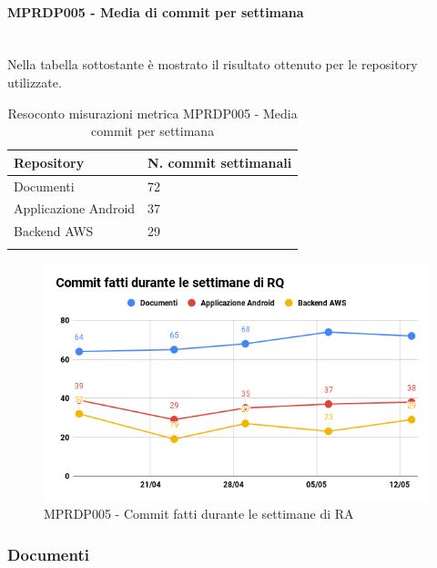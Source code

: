 \paragraph{MPRDP005 - Media di commit per settimana}\mbox{}\\[0.4cm]
Nella tabella sottostante è mostrato il risultato ottenuto per le repository utilizzate.
\begin{center}
	\centering
	\renewcommand{\arraystretch}{1.5}
	\begin{longtable}{  p{5cm}  p{5cm} }
		\rowcolor{tableHeadYellow}
		\textbf{Repository}   & \textbf{N. commit settimanali} \\ 
		\endhead
		Documenti    			   & 72 \\
		Applicazione Android  & 37 \\
		Backend AWS    & 29          \\
		\rowcolor{white}
		\caption{Resoconto misurazioni metrica MPRDP005 - Media commit per settimana}
	\end{longtable}
\end{center}
\begin{figure}[H]
	\centering
	\includegraphics[width=13cm,keepaspectratio]{../includes/pics/Commit_RA.png}
	\caption{\label{fig:mission}MPRDP005 - Commit fatti durante le settimane di RA}
\end{figure}
\subsubsection{Documenti}
